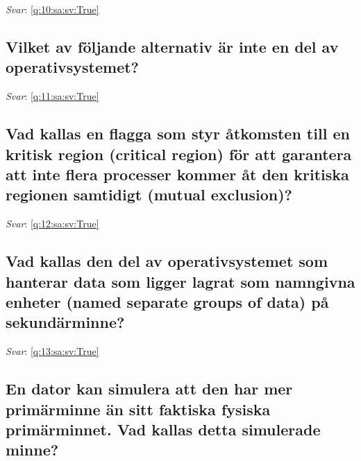 \documentclass[a4paper,11pt,oneside]{article}
\begin{document}
\begin{sloppypar}
\textit{Svar}: \autoref{q:10:sa:sv:True}



\subsection{Vilket av f\"oljande alternativ \"ar inte en del av operativsystemet?}

\label{q:11:sa:sv:False}

\vspace{2cm}

\noindent\makebox[\textwidth]{\hrulefill}

\vspace{1cm}

\textit{Svar}: \autoref{q:11:sa:sv:True}



\subsection{Vad kallas en flagga som styr \r{a}tkomsten till en kritisk region (critical region) f\"or att garantera att inte flera processer kommer \r{a}t den kritiska regionen samtidigt (mutual exclusion)?}

\label{q:12:sa:sv:False}

\vspace{2cm}

\noindent\makebox[\textwidth]{\hrulefill}

\vspace{1cm}

\textit{Svar}: \autoref{q:12:sa:sv:True}



\subsection{Vad kallas den del av operativsystemet som hanterar data som ligger lagrat som namngivna enheter (named separate groups of data) p\r{a} sekund\"arminne?}

\label{q:13:sa:sv:False}

\vspace{2cm}

\noindent\makebox[\textwidth]{\hrulefill}

\vspace{1cm}

\textit{Svar}: \autoref{q:13:sa:sv:True}



\subsection{En dator kan simulera att den har mer prim\"arminne \"an sitt faktiska fysiska prim\"arminnet. Vad kallas detta simulerade minne?}


\end{sloppypar}
\end{document}
